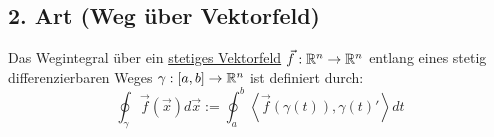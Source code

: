 



\subsection{2. Art (Weg über Vektorfeld)}
Das Wegintegral über ein \underline{stetiges Vektorfeld} $\vec{f}: \mathbb{R}^n \to \mathbb{R}^n$
entlang eines stetig differenzierbaren Weges $\gamma: [a,b] \to \mathbb{R}^n$ ist definiert
durch:
\[
\oint_\gamma \vec{f}(\vec{x}) d\vec{x} := \oint_a^b \left< \vec{f}(\gamma(t)), \gamma(t)' \right> dt
\]


